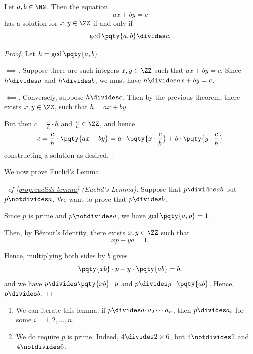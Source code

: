 \begin{corollary}
    Let \(a, b \in \NN\). Then the equation
    \[
        ax + by = c
    \]
    has a solution for \(x, y \in \ZZ\) if and only if
    \[
        \gcd\pqty{a, b} \divides c.
    \]
\end{corollary}

\begin{proof}
    Let \(h = \gcd\pqty{a, b}\)

    \(\implies\). Suppose there are such integers \(x, y \in \ZZ\) such that \(ax + by = c\). Since \(h \divides a\) and \(h \divides b\), we must have \(h \divides ax + by = c\).

    \(\impliedby\). Conversely, suppose \(h \divides c\). Then by the previous theorem, there exists \(x, y \in \ZZ\), such that \(h = ax + by\).

    But then \(c = \frac{c}{h} \cdot h\) and \(\frac{c}{h} \in \ZZ\), and hence
    \[
        c = \frac{c}{h} \cdot \pqty{ax + by} = a \cdot \pqty{x \cdot \frac{c}{h}} + b \cdot \pqty{y \cdot \frac{c}{h}}
    \]
    constructing a solution as desired.
\end{proof}

We now prove Euclid's Lemma.

\begin{proof}[\proofname\ of \autoref{prop:euclids-lemma} (Euclid's Lemma)]
    Suppose that \(p \divides ab\) but \(p \notdivides a\). We want to prove that \(p \divides b\).

    Since \(p\) is prime and \(p \notdivides a\), we have \(\gcd\pqty{a, p} = 1\).

    Then, by B\'{e}zout's Identity, there exists \(x, y \in \ZZ\) such that
    \[
        xp + ya = 1.
    \]

    Hence, multiplying both sides by \(b\) gives
    \[
        \pqty{xb} \cdot p + y \cdot \pqty{ab} = b,
    \]
    and we have \(p \divides \pqty{xb} \cdot p\) and \(p \divides y \cdot \pqty{ab}\). Hence, \(p \divides b\).
\end{proof}

\begin{remarks}
    \begin{enumerate}
        \item We can iterate this lemma: if \(p \divides a_1 a_2 \cdots a_n\), then \(p \divides a_i\) for some \(i = 1, 2, \ldots, n\).
        \item We do require \(p\) is prime. Indeed, \(4 \divides 2 \times 6\), but \(4 \notdivides 2\) and \(4 \notdivides 6\).
    \end{enumerate}
\end{remarks}

